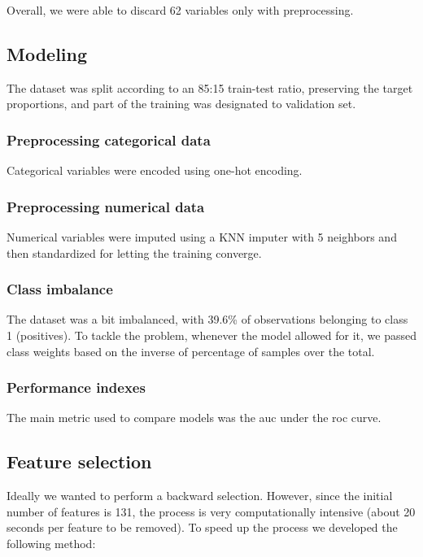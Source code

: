 Overall, we were able to discard 62 variables only with preprocessing.

\subsection{Modeling}

The dataset was split according to an 85:15 train-test ratio, preserving the target proportions, and part of the training was designated to validation set.


\subsubsection{Preprocessing categorical data}

Categorical variables were encoded using one-hot encoding.

\subsubsection{Preprocessing numerical data}

Numerical variables were imputed using a KNN imputer with 5 neighbors and then standardized for letting the training converge.

\subsubsection{Class imbalance}

The dataset was a bit imbalanced, with 39.6\% of observations belonging to class 1 (positives). To tackle the problem, whenever the model allowed for it, we passed class weights based on the inverse of percentage of samples over the total.

\subsubsection{Performance indexes}

The main metric used to compare models was the \gls{auc} under the \gls{roc} curve.

\subsection{Feature selection}

Ideally we wanted to perform a backward selection. However, since the initial number of features is 131, the process is very computationally intensive (about 20 seconds per feature to be removed). To speed up the process we developed the following method:

